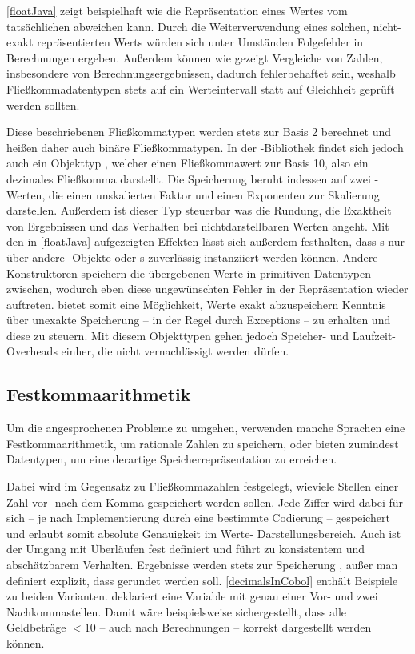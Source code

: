 \autoref{floatJava} zeigt beispielhaft wie die Repräsentation eines Wertes vom tatsächlichen abweichen kann. Durch die Weiterverwendung eines solchen, nicht-exakt repräsentierten Werts würden sich unter Umständen Folgefehler in Berechnungen ergeben. Außerdem können wie gezeigt Vergleiche von Zahlen, insbesondere von Berechnungsergebnissen, dadurch fehlerbehaftet sein, weshalb Fließkommadatentypen stets auf ein Werteintervall statt auf Gleichheit geprüft werden sollten.

Diese beschriebenen Fließkommatypen werden stets zur Basis 2 berechnet und heißen daher auch binäre Fließkommatypen. In der -Bibliothek findet sich jedoch auch ein Objekttyp , welcher einen Fließkommawert zur Basis 10, also ein dezimales Fließkomma darstellt. Die Speicherung beruht in­des­sen auf zwei -Werten, die einen unskalierten Faktor und einen Exponenten zur Skalierung darstellen. Außerdem ist dieser Typ steuerbar was die Rundung, die Exaktheit von Ergebnissen und das Verhalten bei nichtdarstellbaren Werten angeht. Mit den in \autoref{floatJava} aufgezeigten Effekten lässt sich außerdem festhalten, dass s nur über andere -Objekte oder s zuverlässig instanziiert werden können. Andere Konstruktoren speichern die übergebenen Werte in primitiven Datentypen zwischen, wodurch eben diese ungewünschten Fehler in der Repräsentation wieder auftreten.  bietet somit eine Möglichkeit, Werte exakt abzuspeichern \bzw Kenntnis über unexakte Speicherung -- in der Regel durch Exceptions -- zu erhalten und diese zu steuern. Mit diesem Objekttypen gehen jedoch Speicher- und Laufzeit-Overheads einher, die nicht vernachlässigt werden dürfen.

\subsection*{Festkommaarithmetik}
Um die angesprochenen Probleme zu umgehen, verwenden manche Sprachen eine Festkommaarithmetik, um rationale Zahlen zu speichern, oder bieten zumindest Datentypen, um eine derartige Speicherrepräsentation zu erreichen. 

Dabei wird im Gegensatz zu Fließkommazahlen festgelegt, wieviele Stellen einer Zahl vor- \bzw nach dem Komma gespeichert werden sollen. Jede Ziffer wird dabei für sich -- je nach Implementierung durch eine bestimmte Codierung -- gespeichert und erlaubt somit absolute Genauigkeit im Werte- \bzw Darstellungsbereich. Auch ist der Umgang mit Überläufen fest definiert und führt zu konsistentem und abschätzbarem Verhalten. Ergebnisse werden stets zur Speicherung , außer man definiert explizit, dass gerundet werden soll. \autoref{decimalsInCobol} enthält Beispiele zu beiden Varianten.  deklariert eine Variable mit genau einer Vor- und zwei Nachkommastellen. Damit wäre beispielsweise sichergestellt, dass alle Geldbeträge $< 10$ -- auch nach Berechnungen -- korrekt dargestellt werden können.

